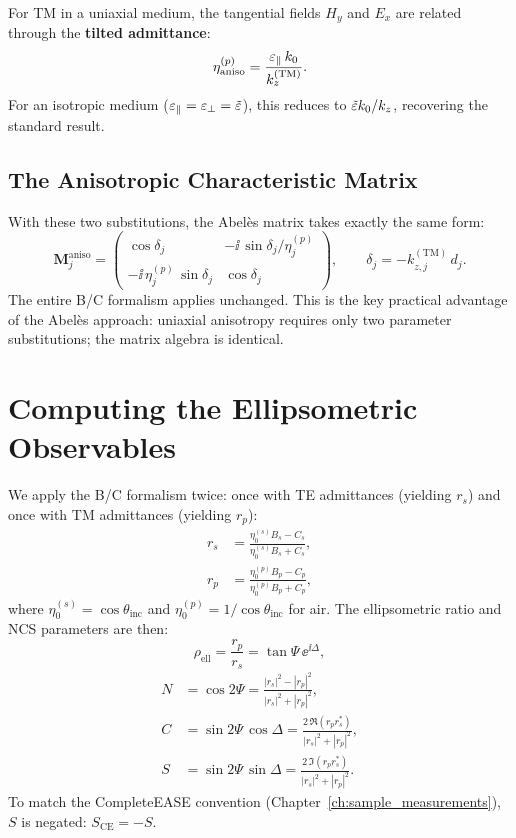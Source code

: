 For TM in a uniaxial medium, the tangential fields $H_y$ and $E_x$ are
related through the \textbf{tilted admittance}:
\begin{equation}
  \eta^{(p)}_\text{aniso} = \frac{\varepsilon_{\parallel}\,k_0}{k_z^{(\mathrm{TM})}}.
  \label{eq:ch5_eta_p_aniso}
\end{equation}
For an isotropic medium ($\varepsilon_{\parallel} = \varepsilon_{\perp} = \tilde{\varepsilon}$), this reduces to
$\tilde{\varepsilon} k_0/k_z$, recovering the standard result.

\subsection{The Anisotropic Characteristic Matrix}

With these two substitutions, the Abelès matrix takes exactly the same form:
\begin{equation}
  \bm{M}_j^\text{aniso} = \begin{pmatrix}
    \cos\delta_j & -\ii\,\sin\delta_j / \eta_j^{(p)} \\
    -\ii\,\eta_j^{(p)}\,\sin\delta_j & \cos\delta_j
  \end{pmatrix},
  \qquad \delta_j = -k_{z,j}^{(\mathrm{TM})}\,d_j.
  \label{eq:ch5_abeles_aniso}
\end{equation}
The entire B/C formalism applies unchanged. This is the key practical
advantage of the Abelès approach: uniaxial anisotropy requires only two
parameter substitutions; the matrix algebra is identical.

\section{Computing the Ellipsometric Observables}

We apply the B/C formalism twice: once with TE admittances (yielding $r_s$)
and once with TM admittances (yielding $r_p$):
\begin{align}
  r_s &= \frac{\eta_0^{(s)} B_s - C_s}{\eta_0^{(s)} B_s + C_s},
  \label{eq:ch5_rs} \\
  r_p &= \frac{\eta_0^{(p)} B_p - C_p}{\eta_0^{(p)} B_p + C_p},
  \label{eq:ch5_rp}
\end{align}
where $\eta_0^{(s)} = \cos\theta_\text{inc}$ and
$\eta_0^{(p)} = 1/\cos\theta_\text{inc}$ for air. The ellipsometric ratio
and NCS parameters are then:
\begin{equation}
  \rho_\text{ell} = \frac{r_p}{r_s} = \tan\Psi\,\ee^{\ii\Delta},
  \label{eq:ch5_rho_ell}
\end{equation}
\begin{align}
  N &= \cos 2\Psi = \frac{|r_s|^2 - |r_p|^2}{|r_s|^2 + |r_p|^2},
  \label{eq:ch5_N} \\
  C &= \sin 2\Psi\,\cos\Delta
     = \frac{2\,\Re(r_p r_s^*)}{|r_s|^2 + |r_p|^2},
  \label{eq:ch5_C} \\
  S &= \sin 2\Psi\,\sin\Delta
     = \frac{2\,\Im(r_p r_s^*)}{|r_s|^2 + |r_p|^2}.
  \label{eq:ch5_S}
\end{align}
To match the CompleteEASE convention (Chapter~\ref{ch:sample_measurements}),
$S$ is negated: $S_\text{CE} = -S$.

